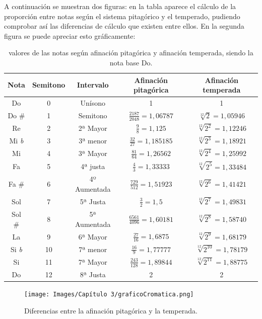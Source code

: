 \documentclass[a4paper, openright, 11pt, titlepage]{report}
\theoremstyle{definition}\newtheorem{defin}[propo]{Definition}
\theoremstyle{definition}\newtheorem{obser}[propo]{Remark}
\theoremstyle{definition}\newtheorem{ejem}[propo]{Ejemplo}
\theoremstyle{definition}\newtheorem{algoritmo}[propo]{Algoritmo}
\begin{document}
A continuación se muestran dos figuras: en la tabla aparece el cálculo de la proporción entre notas según el sistema pitagórico y el temperado, pudiendo comprobar así las diferencias de cálculo que existen entre ellos. En la segunda figura se puede apreciar esto gráficamente:
\begin{table}[H]
    \centering
    \begin{tabular}{|c|c|c|c|c|}
    \hline
         Nota & Semitono & Intervalo & Afinación pitagórica & Afinación temperada\\
         \hline
         \hline
         Do & 0 & Unísono & 1 & 1\\
         Do \# & 1 & Semitono & $\frac{2187}{2048} = 1,06787$ & $\sqrt[12]{2} = 1,05946$\\
         Re & 2 & 2ª Mayor & $\frac{9}{8} = 1,125$ & $\sqrt[12]{2^{2}} = 1,12246$\\
         Mi \textit{b} & 3 & 3ª menor & $\frac{32}{27} = 1,185185$ & $\sqrt[12]{2^{3}} = 1,18921$\\
         Mi & 4 & 3ª Mayor & $\frac{81}{64} = 1,26562$ & $\sqrt[12]{2^{4}} = 1,25992$\\
         Fa & 5 & 4ª justa & $\frac{4}{3} = 1,33333$ & $\sqrt[12]{2^{5}} = 1,33484$\\
         Fa \# & 6 & 4º Aumentada & $\frac{729}{512} = 1,51923$ & $\sqrt[12]{2^{6}} = 1,41421$\\
         Sol & 7 & 5ª Justa & $\frac{3}{2} = 1,5$ & $\sqrt[12]{2^{7}} = 1,49831$\\
         Sol \# & 8 & 5ª Aumentada & $\frac{6561}{4096} = 1,60181$ & $\sqrt[12]{2^{8}} = 1,58740$\\
         La & 9 & 6ª Mayor & $\frac{27}{16} = 1,6875$ & $\sqrt[12]{2^{9}} = 1,68179$\\
         Si \textit{b} & 10 & 7ª menor & $\frac{16}{9} = 1,77777$ & $\sqrt[12]{2^{10}} = 1,78179$\\
         Si & 11 & 7ª Mayor & $\frac{243}{128} = 1,89844$ & $\sqrt[12]{2^{11}} = 1,88775$\\
         Do & 12 & 8ª Justa & 2 & 2\\
         \hline
    \end{tabular}
    \caption{valores de las notas según afinación pitagórica y afinación temperada, siendo la nota base Do.}
    \label{tab:my_label}
\end{table}
\begin{figure}[H]
    \centering
    \texttt{[image: Images/Capítulo 3/graficoCromatica.png]}
    \caption{Diferencias entre la afinación pitagórica y la temperada.}
\end{figure}
\end{document}
